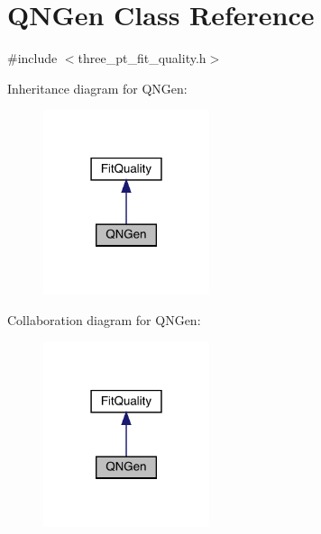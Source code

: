 \hypertarget{classQNGen}{}\section{Q\+N\+Gen Class Reference}
\label{classQNGen}


{\ttfamily \#include $<$three\+\_\+pt\+\_\+fit\+\_\+quality.\+h$>$}



Inheritance diagram for Q\+N\+Gen\+:
\nopagebreak
\begin{figure}[H]
\begin{center}
\leavevmode
\includegraphics[width=138pt]{d6/ddc/classQNGen__inherit__graph}
\end{center}
\end{figure}


Collaboration diagram for Q\+N\+Gen\+:
\nopagebreak
\begin{figure}[H]
\begin{center}
\leavevmode
\includegraphics[width=138pt]{d2/d0f/classQNGen__coll__graph}
\end{center}
\end{figure}
